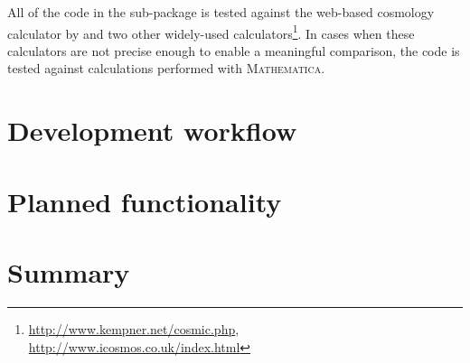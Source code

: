 \documentclass[traditabstract]{aa}
\begin{document}
All of the code in the sub-package is tested against the web-based
cosmology calculator by \citet{Wright06} and two other widely-used
calculators\footnote{\url{http://www.kempner.net/cosmic.php},\\ \url{http://www.icosmos.co.uk/index.html}}.
In cases when these calculators are not precise enough to enable a
meaningful comparison, the code is tested against calculations
performed with \textsc{Mathematica}.

\section{Development workflow}

\label{sec:workflow}




\section{Planned functionality}

\label{sec:future}



\section{Summary}

\label{sec:summary}




\end{document}
